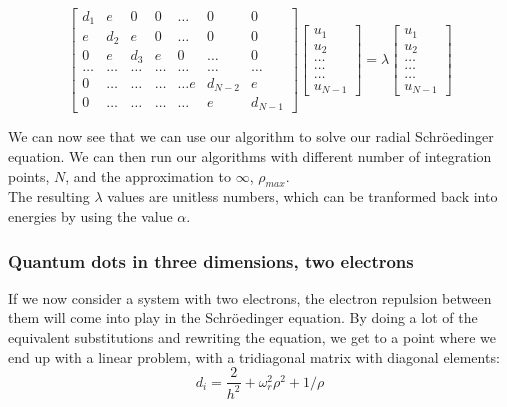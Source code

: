 \documentclass{article}
\begin{document}
			\begin{equation*}
				\begin{bmatrix}
					d_1 & e & 0   & 0    & \dots  &0     & 0 \\
					e & d_2 & e & 0    & \dots  &0     &0 \\
					0   & e & d_3 & e  &0       &\dots & 0\\
					\dots  & \dots & \dots & \dots  &\dots      &\dots & \dots\\
					0   & \dots & \dots & \dots  &\dots  e     &d_{N-2} & e\\
					0   & \dots & \dots & \dots  &\dots       &e & d_{N-1}
				\end{bmatrix}
				\begin{bmatrix}
					u_{1} \\
					u_{2} \\
					\dots\\ \dots\\ \dots\\
					u_{N-1}
				\end{bmatrix}
				= \lambda \begin{bmatrix}
					u_{1} \\
					u_{2} \\
					\dots\\ \dots\\ \dots\\
					u_{N-1}
				\end{bmatrix}
				\label{eq:sematrix}
			\end{equation*}

			We can now see that we can use our algorithm to solve our radial Schröedinger equation.
			We can then run our algorithms with different number of integration points,
			$N$, and the approximation to $\infty$, $\rho_{max}$.\\
			The resulting $\lambda$ values are unitless numbers,
			which can be tranformed back into energies by using the value $\alpha$.

		\subsubsection{Quantum dots in three dimensions, two electrons}
			If we now consider a system with two electrons,
			the electron repulsion between them will come into play in the Schröedinger equation.
			By doing a lot of the equivalent substitutions and rewriting the equation,
			we get to a point where we end up with a linear problem,
			with a tridiagonal matrix with diagonal elements:
			\begin{equation*}
				d_i = \frac{2}{h^2} + \omega_r^2 \rho^2 + 1/\rho
			\end{equation*}
\end{document}
